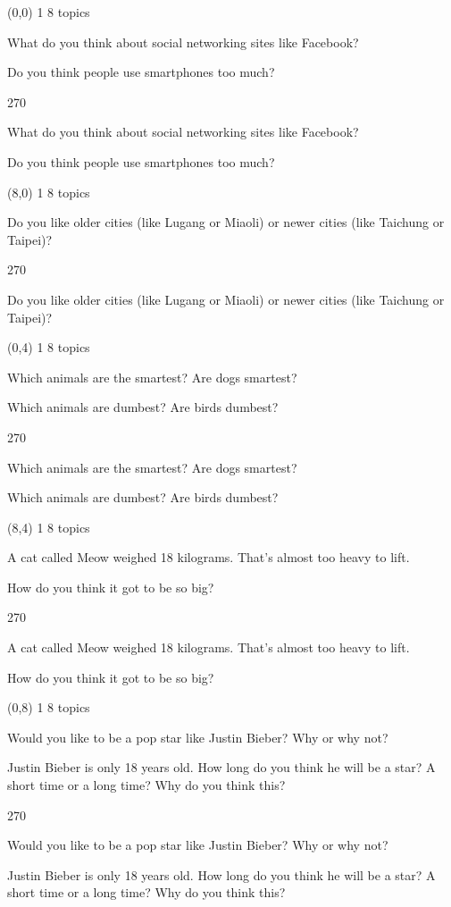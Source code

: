 \documentclass[a4paper]{article}
\newenvironment{itemize*}%
{\begin{itemize}%
 \setlength{\itemsep}{0.5cm}%
 \setlength{\parsep}{0pt}%
 \setlength{\parskip}{0pt}}%
{\end{itemize}}
\newcommand{\mycard}[3]{%
	\small #1 #2
	\par
	\parbox[t][6.8cm][c]{9.5cm}{%
	\par
	\myleft{#3}
	\par
	\myright{#3}
	}
}
\newcommand{\myleft}[1]{%
	\begin{sideways}
	\hspace*{-0.9cm}
		\parbox[t][2.7cm][t]{6.5cm}{%
		\large #1
		}
	\end{sideways}
}
\newcommand{\myright}[1]{%
	\hspace*{6.5cm}
	\begin{turn}{270}
	\hspace*{-7.1cm}
		\parbox[t][2.7cm][t]{6.5cm}{%
		\large #1
		}
	\end{turn}
}
\begin{document}
\begin{textblock}{8}(0,0)
\mycard{1}{8 topics}{
\begin{itemize*}
\item What do you think about social networking sites like Facebook?
\item Do you think people use smartphones too much?
\end{itemize*}
}
\end{textblock}

\begin{textblock}{8}(8,0)
\mycard{1}{8 topics}{
\begin{itemize*}
\item Do you like older cities (like Lugang or Miaoli) or newer cities (like Taichung or Taipei)?
\end{itemize*}
}
\end{textblock}

\begin{textblock}{8}(0,4)
\mycard{1}{8 topics}{
\begin{itemize*}
\item Which animals are the smartest? Are dogs smartest?
\item Which animals are dumbest? Are birds dumbest?
\end{itemize*}
}
\end{textblock}

\begin{textblock}{8}(8,4)
\mycard{1}{8 topics}{
\begin{itemize*}
\item A cat called Meow weighed 18 kilograms. That's almost too heavy to lift.
\item How do you think it got to be so big?
\end{itemize*}
}
\end{textblock}

\begin{textblock}{8}(0,8)
\mycard{1}{8 topics}{
\begin{itemize*}
\item Would you like to be a pop star like Justin Bieber? Why or why not?
\item Justin Bieber is only 18 years old. How long do you think he will be a star? A short time or a long time? Why do you think this?
\end{itemize*}
}
\end{textblock}
\end{document}
